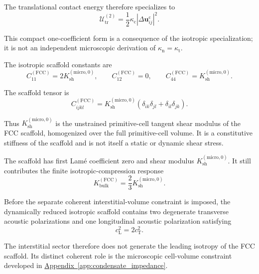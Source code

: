 The translational contact energy therefore specializes to
\begin{equation}
    \mathcal{U}_{\mathrm{tr}}^{(2)}
    =
    \frac{1}{2}
    \kappa_{\mathrm{c}}
    \left|\Delta\mathbf{u}_{ij}^{\mathrm{c}}\right|^2.
\end{equation}

This compact one-coefficient form is a consequence of the isotropic specialization; it is not an independent microscopic derivation of $\kappa_{\mathrm{n}}=\kappa_{\mathrm{t}}$.

The isotropic scaffold constants are
\begin{equation}
    C_{11}^{(\mathrm{FCC})} = 2K_{\mathrm{sh}}^{(\mathrm{micro},0)}, \qquad C_{12}^{(\mathrm{FCC})} = 0, \qquad C_{44}^{(\mathrm{FCC})} = K_{\mathrm{sh}}^{(\mathrm{micro},0)}.
\end{equation}

The scaffold tensor is
\begin{equation}
    C_{ijkl}^{(\mathrm{FCC})} = K_{\mathrm{sh}}^{(\mathrm{micro},0)}\left(\delta_{ik}\delta_{jl}+\delta_{il}\delta_{jk}\right).
\end{equation}

Thus $K_{\mathrm{sh}}^{(\mathrm{micro},0)}$ is the unstrained primitive-cell tangent shear modulus of the FCC scaffold, homogenized over the full primitive-cell volume. It is a constitutive stiffness of the scaffold and is not itself a static or dynamic shear stress.

The scaffold has first Lam\'e coefficient zero and shear modulus $K_{\mathrm{sh}}^{(\mathrm{micro},0)}$. It still contributes the finite isotropic-compression response
\begin{equation}
    K_{\mathrm{bulk}}^{(\mathrm{FCC})} = \frac{2}{3}K_{\mathrm{sh}}^{(\mathrm{micro},0)}.
\end{equation}

Before the separate coherent interstitial-volume constraint is imposed, the dynamically reduced isotropic scaffold contains two degenerate transverse acoustic polarizations and one longitudinal acoustic polarization satisfying
\begin{equation}
    c_{\mathrm{L}}^2 = 2c_{\mathrm{T}}^2.
\end{equation}

The interstitial sector therefore does not generate the leading isotropy of the FCC scaffold. Its distinct coherent role is the microscopic cell-volume constraint developed in \hyperref[app:condensate_impedance]{Appendix~\ref*{app:condensate_impedance}}.


